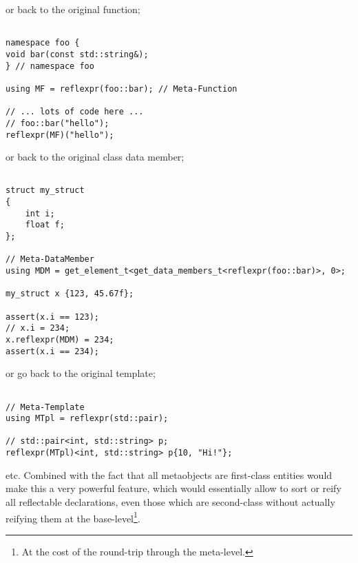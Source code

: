 or back to the original function;

\begin{verbatim}

namespace foo {
void bar(const std::string&);
} // namespace foo

using MF = reflexpr(foo::bar); // Meta-Function

// ... lots of code here ...
// foo::bar("hello");
reflexpr(MF)("hello");

\end{verbatim}

or back to the original class data member;

\begin{verbatim}

struct my_struct
{
	int i;
	float f;
};

// Meta-DataMember
using MDM = get_element_t<get_data_members_t<reflexpr(foo::bar)>, 0>;

my_struct x {123, 45.67f};

assert(x.i == 123);
// x.i = 234;
x.reflexpr(MDM) = 234;
assert(x.i == 234);

\end{verbatim}

or go back to the original template;

\begin{verbatim}

// Meta-Template
using MTpl = reflexpr(std::pair);

// std::pair<int, std::string> p;
reflexpr(MTpl)<int, std::string> p{10, "Hi!"};

\end{verbatim}

etc.
Combined with the fact that all metaobjects are first-class
entities would make this a very powerful feature, which would essentially
allow to sort or reify all reflectable declarations, even those which are
second-class without actually reifying them at the base-level\footnote{
At the cost of the round-trip through the meta-level.}.

